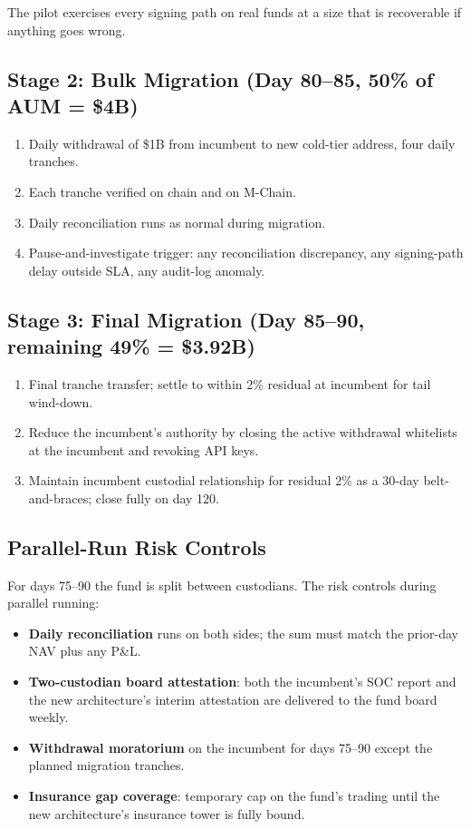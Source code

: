The pilot exercises every signing path on real funds at a size that
is recoverable if anything goes wrong.

\subsection{Stage 2: Bulk Migration (Day 80--85, 50\% of AUM = \$4B)}

\begin{enumerate}[nosep]
\item Daily withdrawal of \$1B from incumbent to new cold-tier
address, four daily tranches.
\item Each tranche verified on chain and on M-Chain.
\item Daily reconciliation runs as normal during migration.
\item Pause-and-investigate trigger: any reconciliation discrepancy,
any signing-path delay outside SLA, any audit-log anomaly.
\end{enumerate}

\subsection{Stage 3: Final Migration (Day 85--90, remaining 49\% = \$3.92B)}

\begin{enumerate}[nosep]
\item Final tranche transfer; settle to within 2\% residual at
incumbent for tail wind-down.
\item Reduce the incumbent's authority by closing the active
withdrawal whitelists at the incumbent and revoking API keys.
\item Maintain incumbent custodial relationship for residual 2\% as
a 30-day belt-and-braces; close fully on day 120.
\end{enumerate}

\subsection{Parallel-Run Risk Controls}

For days 75--90 the fund is split between custodians. The risk
controls during parallel running:

\begin{itemize}[nosep]
\item \textbf{Daily reconciliation} runs on both sides; the sum must
match the prior-day NAV plus any P\&L.
\item \textbf{Two-custodian board attestation}: both the incumbent's
SOC report and the new architecture's interim attestation are
delivered to the fund board weekly.
\item \textbf{Withdrawal moratorium} on the incumbent for days
75--90 except the planned migration tranches.
\item \textbf{Insurance gap coverage}: temporary cap on the fund's
trading until the new architecture's insurance tower is fully bound.
\end{itemize}

